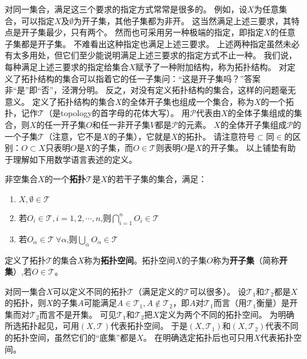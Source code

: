 对同一集合，满足这三个要求的指定方式常常是很多的。
例如，设$X$为任意集合，可以指定$X$及$\emptyset$为开子集，其他子集都为非开。
这当然满足上述三要求，其特点是开子集最少，只有两个。
然而也可采用另一种极端的指定，即指定$X$的任意子集都是开子集。
不难看出这种指定也满足上述三要求。
上述两种指定虽然未必有太多用处，但它们至少能说明满足上述三要求的指定方式不止一种。
我们说，每种满足上述三要求的指定给集合$X$赋予了一种附加结构，称为拓扑结构。
对定义了拓扑结构的集合可以指着它的任一子集问：``这是开子集吗？''答案非``是''即``否''，泾渭分明。
反之，对没有定义拓扑结构的集合，这样的问题毫无意义。
定义了拓扑结构的集合$X$的全体开子集也组成一个集合，称为$X$的一个拓扑，记作$\mathscr{T}$（是topology的首字母的花体大写）。
用$\mathscr{P}$代表由$X$的全体子集组成的集合，则$X$的任一开子集$O$和任一非开子集$V$都是$\mathscr{P}$的元素。
$X$的全体开子集组成$\mathscr{P}$的一个子集$\mathscr{T}$（注意，它不是$X$的子集），它就是$X$的拓扑。
请注意符号$\subset$同$\in$的区别：$O \subset X$只表明$O$是$X$的子集，而$O \in \mathscr{T}$则表明$O$是$X$的开子集。
以上铺垫有助于理解如下用数学语言表述的定义。

\begin{definition}
	非空集合$X$的一个\textbf{拓扑}$\mathscr{T}$是$X$的若干子集的集合，满足：
	\begin{enumerate}[（a）]
		\item $X,\emptyset \in \mathscr{T}$
		\item 若$O_i \in \mathscr{T}, i = 1, 2, \cdots, n$,则$\bigcap\limits^n_{i = 1}O_i \in \mathscr{T}$
		\item 若$O_\alpha \in \mathscr{T} ~ \forall \alpha$,则$\bigcup\limits_{\alpha}O_\alpha \in \mathscr{T}$
	\end{enumerate}
\end{definition}

\begin{definition}
	定义了拓扑$\mathscr{T}$的集合$X$称为\textbf{拓扑空间}。拓扑空间$X$的子集$O$称为\textbf{开子集}（简称\textbf{开集}）,若$O \in \mathscr{T}$。
\end{definition}

对同一集合$X$可以定义不同的拓扑$\mathscr{T}$（满足定义的$\mathscr{T}$可以很多）。
设$\mathscr{T}_1$和$\mathscr{T}_2$都是$X$的拓扑，则$X$的子集$A$可能满足$A \in \mathscr{T}_1, A \notin \mathscr{T}_2$，即$A$对$\mathscr{T}_1$而言（用$\mathscr{T}_1$衡量）是开集而对$\mathscr{T}_2$而言不是开集。
可见$\mathscr{T}_1$和$\mathscr{T}_2$把$X$定义为两个不同的拓扑空间。
为明确所选拓扑起见，可用$(X, \mathscr{T})$代表拓扑空间。
于是$(X, \mathscr{T}_1)$和$(X, \mathscr{T}_2)$代表不同的拓扑空间，虽然它们的``底集''都是$X$。
在明确选定拓扑后也可只用$X$代表拓扑空间。

